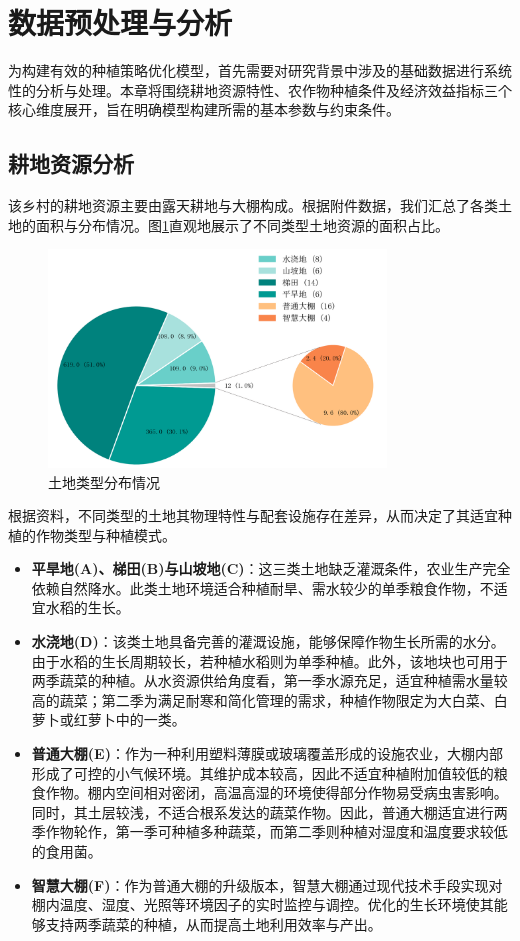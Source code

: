 \section{数据预处理与分析}

为构建有效的种植策略优化模型，首先需要对研究背景中涉及的基础数据进行系统性的分析与处理。本章将围绕耕地资源特性、农作物种植条件及经济效益指标三个核心维度展开，旨在明确模型构建所需的基本参数与约束条件。

\subsection{耕地资源分析}

该乡村的耕地资源主要由露天耕地与大棚构成。根据附件数据，我们汇总了各类土地的面积与分布情况。图\ref{fig:land_distribution}直观地展示了不同类型土地资源的面积占比。

\begin{figure}[htbp]
    \centering
    \includegraphics[width=0.8\textwidth]{figs/2数据分析与预处理/土地类型分布.png}
    \caption{土地类型分布情况}
    \label{fig:land_distribution}
\end{figure}

根据资料，不同类型的土地其物理特性与配套设施存在差异，从而决定了其适宜种植的作物类型与种植模式。
\begin{itemize}
    \item \textbf{平旱地(A)、梯田(B)与山坡地(C)}：这三类土地缺乏灌溉条件，农业生产完全依赖自然降水。此类土地环境适合种植耐旱、需水较少的单季粮食作物，不适宜水稻的生长。
    \item \textbf{水浇地(D)}：该类土地具备完善的灌溉设施，能够保障作物生长所需的水分。由于水稻的生长周期较长，若种植水稻则为单季种植。此外，该地块也可用于两季蔬菜的种植。从水资源供给角度看，第一季水源充足，适宜种植需水量较高的蔬菜；第二季为满足耐寒和简化管理的需求，种植作物限定为大白菜、白萝卜或红萝卜中的一类。
    \item \textbf{普通大棚(E)}：作为一种利用塑料薄膜或玻璃覆盖形成的设施农业，大棚内部形成了可控的小气候环境。其维护成本较高，因此不适宜种植附加值较低的粮食作物。棚内空间相对密闭，高温高湿的环境使得部分作物易受病虫害影响。同时，其土层较浅，不适合根系发达的蔬菜作物。因此，普通大棚适宜进行两季作物轮作，第一季可种植多种蔬菜，而第二季则种植对湿度和温度要求较低的食用菌。
    \item \textbf{智慧大棚(F)}：作为普通大棚的升级版本，智慧大棚通过现代技术手段实现对棚内温度、湿度、光照等环境因子的实时监控与调控。优化的生长环境使其能够支持两季蔬菜的种植，从而提高土地利用效率与产出。
\end{itemize}

